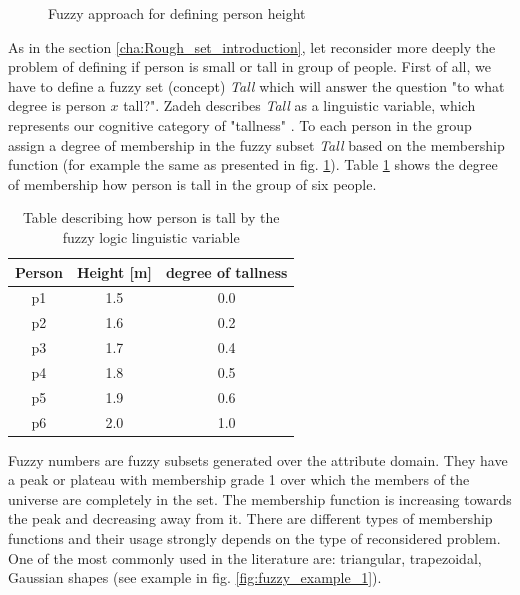 \begin{itemize}
\begin{figure}[H]
\begin{center}
            \end{center}
            \caption{Fuzzy approach for defining person height}
            \label{fig:fuzzy_tall}
        \end{figure}
\end{itemize}

As in the section \ref{cha:Rough_set_introduction}, let reconsider more deeply the problem of defining 
if person is small or tall in group of people. First of all, we have to define a fuzzy
set (concept) \textit{Tall} which will answer the question 
"to what degree is person $x$ tall?". Zadeh describes \textit{Tall} as a
linguistic variable, which represents our cognitive category of "tallness"
\cite{bib25}. To each person in the group assign a degree of membership in the fuzzy subset \textit{Tall}
based on the membership function (for example the same as presented in fig.
\ref{fig:fuzzy_tall}). Table \ref{tab:fuzzy_logic_example} shows the degree of
membership how person is tall in the group of six people.
\begin{table}[H]
    \centering
    \caption{Table describing how person is tall by the fuzzy logic linguistic
    variable}
    \begin{tabular}{|c|c|c|}
        \hline
        Person & Height [m] & degree of tallness \\ \hline \hline
        p1 & 1.5 & 0.0 \\ \hline
        p2 & 1.6 & 0.2 \\ \hline
        p3 & 1.7 & 0.4 \\ \hline
        p4 & 1.8 & 0.5 \\ \hline
        p5 & 1.9 & 0.6 \\ \hline
        p6 & 2.0 & 1.0 \\ \hline
    \end{tabular}
    \label{tab:fuzzy_logic_example}
\end{table}

Fuzzy numbers are fuzzy subsets generated over the attribute domain. 
They have a peak or plateau with membership grade 1 over which the 
members of the universe are completely in the set.  The membership 
function is increasing towards the peak and decreasing away from it. 
There are different types of membership functions and their usage 
strongly depends on the type of reconsidered problem. One of the most 
commonly used in the literature are: triangular, trapezoidal, Gaussian shapes
(see example in fig. \ref{fig:fuzzy_example_1}).

